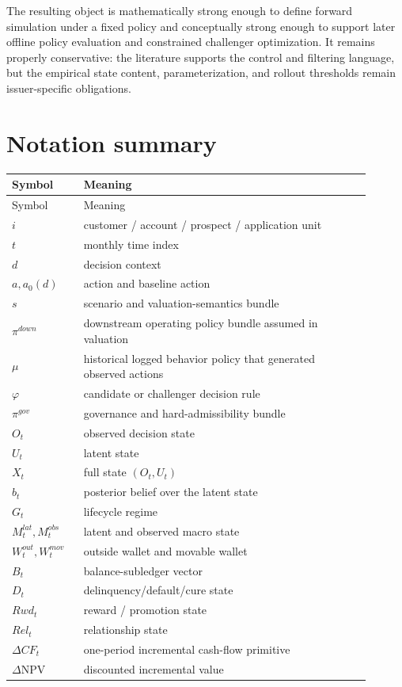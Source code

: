 \documentclass[11pt]{article}
\newcommand{\NPV}{\mathrm{NPV}}
\newcommand{\1}{\mathbf{1}}
\theoremstyle{definition}
\begin{document}
The resulting object is mathematically strong enough to define forward
simulation under a fixed policy and conceptually strong enough to support later
offline policy evaluation and constrained challenger optimization. It remains
properly conservative: the literature supports the control and filtering
language, but the empirical state content, parameterization, and rollout
thresholds remain issuer-specific obligations.

\appendix

\section{Notation summary}

\begin{longtable}{L{0.18\linewidth}L{0.72\linewidth}}
\toprule
Symbol & Meaning \\
\midrule
\endfirsthead
\toprule
Symbol & Meaning \\
\midrule
\endhead
$i$ & customer / account / prospect / application unit \\
$t$ & monthly time index \\
$d$ & decision context \\
$a, a_0(d)$ & action and baseline action \\
$s$ & scenario and valuation-semantics bundle \\
$\pi^{down}$ & downstream operating policy bundle assumed in valuation \\
$\mu$ & historical logged behavior policy that generated observed actions \\
$\varphi$ & candidate or challenger decision rule \\
$\pi^{gov}$ & governance and hard-admissibility bundle \\
$O_t$ & observed decision state \\
$U_t$ & latent state \\
$X_t$ & full state $(O_t,U_t)$ \\
$b_t$ & posterior belief over the latent state \\
$G_t$ & lifecycle regime \\
$M_t^{lat},M_t^{obs}$ & latent and observed macro state \\
$W_t^{out},W_t^{mov}$ & outside wallet and movable wallet \\
$B_t$ & balance-subledger vector \\
$D_t$ & delinquency/default/cure state \\
$Rwd_t$ & reward / promotion state \\
$Rel_t$ & relationship state \\
$\Delta CF_t$ & one-period incremental cash-flow primitive \\
$\Delta \NPV$ & discounted incremental value \\
\bottomrule
\end{longtable}
\end{document}
